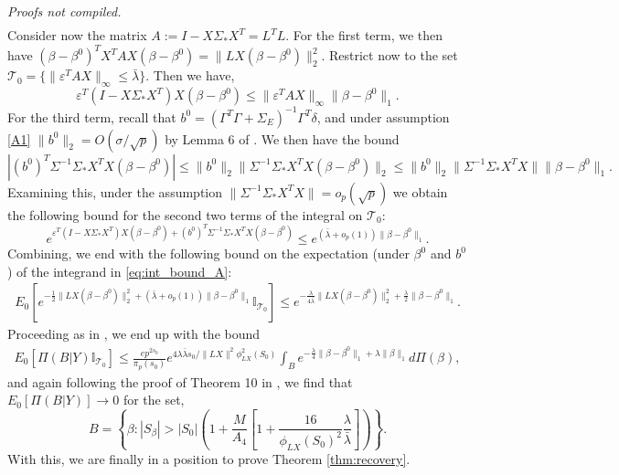 \documentclass[11pt]{article}
\renewenvironment{proof}[1]{\par\noindent{\bf #1 \ }}{\hfill\BlackBox\\[2mm]}
\renewenvironment{proof}[1]{\textit{Proofs not compiled.}}{}
\newcommand{\eps}{\varepsilon}
\newcommand{\bezero}{\beta^0}
\newcommand{\postCov}{\Sigma_*}
\begin{document}
\begin{proof}{Proof of Theorem \ref{thm:dimension}.}
\begin{align}
	\end{align}
	Consider now the matrix $A := I - X\postCov X^T = L^TL$. For the first term, we then have $(\beta - \bezero)^TX^TAX(\beta - \bezero) = \|LX(\beta - \bezero)\|_2^2$. Restrict now to the set $\mathcal{T}_0 = \{\|\eps^TAX\|_\infty \leq \bar{\lambda}\}$. Then we have,
$$
\eps^T (I - X\postCov  X^T)X(\beta - \bezero) \leq \|\eps^T AX\|_\infty\|\beta - \bezero\|_1.
$$
For the third term, recall that $b^0 = (\Gamma^T\Gamma + \Sigma_E)^{-1} \Gamma^T \delta$, and under assumption \eqref{A1} $\|b^0\|_2 = O(\sigma/\sqrt{p})$ by Lemma 6 of \cite{CBM2020}. We then have the bound
$$
|(b^0)^T\Sigma^{-1}\postCov  X^TX (\beta - \bezero)| \leq \|b^0\|_2 \|\Sigma^{-1}\postCov  X^TX (\beta - \bezero) \|_2 \leq \|b^0\|_2\|\Sigma^{-1}\postCov  X^TX\| \|\beta - \bezero\|_1.
$$
Examining this, under the assumption {\color{assumption} $\|\Sigma^{-1} \postCov  X^TX\| = o_p(\sqrt{p})$} we obtain the following bound for the second two terms of the integral on $\mathcal{T}_0:$
$$
e^{\eps^T (I - X\postCov  X^T)X(\beta - \bezero) +(b^0)^T\Sigma^{-1}\postCov  X^TX (\beta - \bezero)} \leq e^{(\bar{\lambda} + o_p(1) )\|\beta - \bezero\|_1}.
$$
Combining, we end with the following bound on the expectation (under $\bezero$ and $b^0$) of the integrand in \eqref{eq:int_bound_A}:
\begin{align*}
E_0\left[e^{-\frac{1}{2}\|LX(\beta - \bezero)\|_2^2 + (\bar{\lambda}+o_p(1))\|\beta - \bezero\|_1} \mathbb{I}_{\mathcal{T}_0}\right] \leq e^{-\frac{\lambda}{4\bar{\lambda}}\|LX(\beta - \bezero)\|_2^2 + \frac{\lambda}{2}\|\beta - \bezero\|_1}.
\end{align*}
Proceeding as in \cite{CS-HV2015}, we end up with the bound
\begin{align*}
E_0\left[\Pi(B | Y) \mathbb{I}_{\mathcal{T}_0 }\right] \leq  \frac{e p^{2s_0}}{\pi_p(s_0)}e^{4\lambda \bar{\lambda}s_0 / \|LX\|^2\phi^2_{LX}(S_0)} \int_B e^{-\frac{\lambda}{4} \|\beta - \bezero\|_1 + \lambda\|\beta\|_1} d\Pi(\beta),
\end{align*}
and again following the proof of Theorem 10 in \cite{CS-HV2015}, we find that $E_0\left[\Pi( B | Y) \right] \rightarrow 0$ for the set,
$$
B = \left\{\beta: |S_\beta| > |S_0|\left(1 + \frac{M}{A_4}\left[1 + \frac{16}{\phi_{LX}(S_0)^2}\frac{\lambda}{\bar{\lambda}} \right]\right)\right\}.
$$
\end{proof}
With this, we are finally in a position to prove Theorem \ref{thm:recovery}. \\
\end{document}
